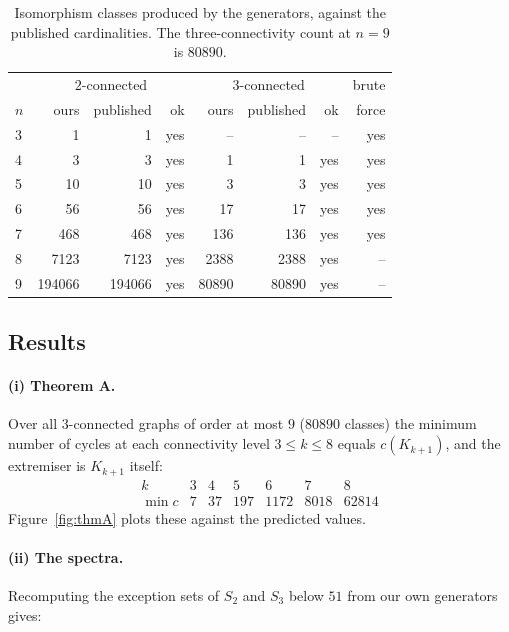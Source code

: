 \documentclass[11pt,a4paper]{article}
\theoremstyle{definition}
\newcommand{\KZ}{K_{k+1}}
\begin{document}
\begin{table}[t]
\centering
\small
\caption{Isomorphism classes produced by the generators, against the published
cardinalities.  The three-connectivity count at $n=9$ is $80890$.}
\begin{tabular}{@{}lrrrrrrr@{}}
\toprule
& \multicolumn{3}{c}{$2$-connected} & \multicolumn{3}{c}{$3$-connected} & brute\\
$n$ & ours & published & ok & ours & published & ok & force\\
\midrule
3  & 1      & 1      & yes & --     & --     & --  & yes\\
4  & 3      & 3      & yes & 1      & 1      & yes & yes\\
5  & 10     & 10     & yes & 3      & 3      & yes & yes\\
6  & 56     & 56     & yes & 17     & 17     & yes & yes\\
7  & 468    & 468    & yes & 136    & 136    & yes & yes\\
8  & 7123   & 7123   & yes & 2388   & 2388   & yes & --\\
9  & 194066 & 194066 & yes & 80890  & 80890  & yes & --\\
\bottomrule
\end{tabular}
\end{table}

\subsection{Results}

\paragraph{(i) Theorem A.}  Over all $3$-connected graphs of order at most
$9$ ($80890$ classes) the minimum number of cycles at each connectivity level
$3\le k\le 8$ equals $c(\KZ)$, and the extremiser is $\KZ$ itself:
\[
\begin{array}{c|rrrrrr}
 k & 3 & 4 & 5 & 6 & 7 & 8\\
 \hline
 \min c & 7 & 37 & 197 & 1172 & 8018 & 62814
\end{array}
\]
Figure~\ref{fig:thmA} plots these against the predicted values.

\paragraph{(ii) The spectra.}  Recomputing the exception sets of $S_2$ and
$S_3$ below $51$ from our own generators gives:
\end{document}
